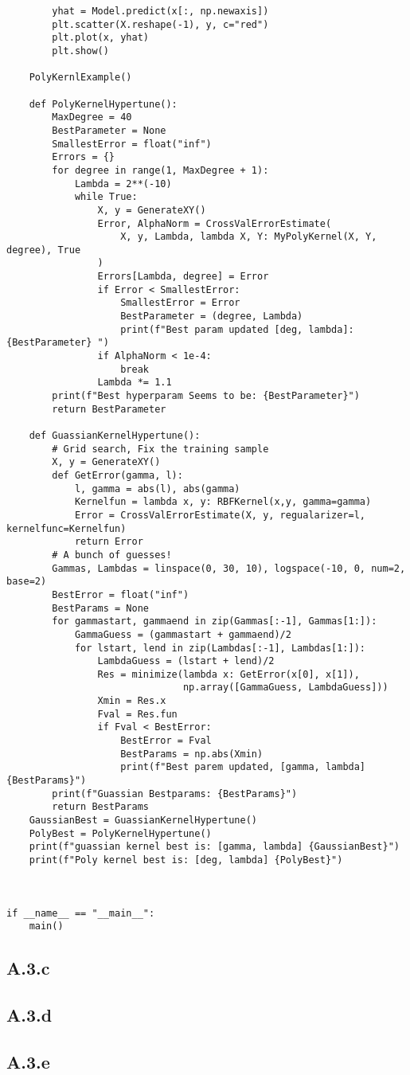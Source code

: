 \documentclass[]{article}
\begin{document}
\begin{lstlisting}
        yhat = Model.predict(x[:, np.newaxis])
        plt.scatter(X.reshape(-1), y, c="red")
        plt.plot(x, yhat)
        plt.show()

    PolyKernlExample()

    def PolyKernelHypertune():
        MaxDegree = 40
        BestParameter = None
        SmallestError = float("inf")
        Errors = {}
        for degree in range(1, MaxDegree + 1):
            Lambda = 2**(-10)
            while True:
                X, y = GenerateXY()
                Error, AlphaNorm = CrossValErrorEstimate(
                    X, y, Lambda, lambda X, Y: MyPolyKernel(X, Y, degree), True
                )
                Errors[Lambda, degree] = Error
                if Error < SmallestError:
                    SmallestError = Error
                    BestParameter = (degree, Lambda)
                    print(f"Best param updated [deg, lambda]:{BestParameter} ")
                if AlphaNorm < 1e-4:
                    break
                Lambda *= 1.1
        print(f"Best hyperparam Seems to be: {BestParameter}")
        return BestParameter

    def GuassianKernelHypertune():
        # Grid search, Fix the training sample
        X, y = GenerateXY()
        def GetError(gamma, l):
            l, gamma = abs(l), abs(gamma)
            Kernelfun = lambda x, y: RBFKernel(x,y, gamma=gamma)
            Error = CrossValErrorEstimate(X, y, regualarizer=l, kernelfunc=Kernelfun)
            return Error
        # A bunch of guesses!
        Gammas, Lambdas = linspace(0, 30, 10), logspace(-10, 0, num=2, base=2)
        BestError = float("inf")
        BestParams = None
        for gammastart, gammaend in zip(Gammas[:-1], Gammas[1:]):
            GammaGuess = (gammastart + gammaend)/2
            for lstart, lend in zip(Lambdas[:-1], Lambdas[1:]):
                LambdaGuess = (lstart + lend)/2
                Res = minimize(lambda x: GetError(x[0], x[1]),
                               np.array([GammaGuess, LambdaGuess]))
                Xmin = Res.x
                Fval = Res.fun
                if Fval < BestError:
                    BestError = Fval
                    BestParams = np.abs(Xmin)
                    print(f"Best parem updated, [gamma, lambda] {BestParams}")
        print(f"Guassian Bestparams: {BestParams}")
        return BestParams
    GaussianBest = GuassianKernelHypertune()
    PolyBest = PolyKernelHypertune()
    print(f"guassian kernel best is: [gamma, lambda] {GaussianBest}")
    print(f"Poly kernel best is: [deg, lambda] {PolyBest}")



if __name__ == "__main__":
    main()
        \end{lstlisting}
        
    \subsection*{A.3.c}
        
    \subsection*{A.3.d}

    \subsection*{A.3.e}
    
    
\end{document}
